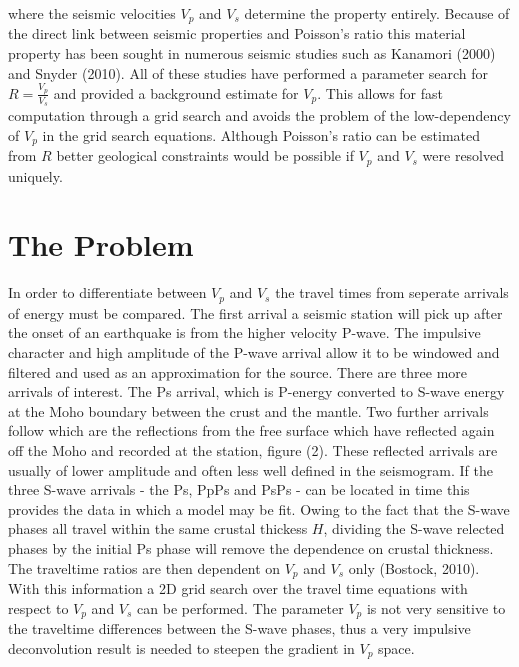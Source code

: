 \documentclass[jgrga]{agutex}
\begin{document}
\begin{article}
where the seismic velocities $V_p$ and $V_s$ determine the property entirely. Because of the direct link between seismic properties and Poisson's ratio this material property has been sought in numerous seismic studies such as Kanamori (2000) and Snyder (2010). All of these studies have performed a parameter search for $R = \frac{V_p}{V_s}$ and provided a background estimate for $V_p$. This allows for fast computation through a grid search and avoids the problem of the low-dependency of $V_p$ in the grid search equations. Although Poisson's ratio can be estimated from $R$ better geological constraints would be possible if $V_p$ and $V_s$ were resolved uniquely. 

\section{The Problem}

In order to differentiate between $V_p$ and $V_s$ the travel times from seperate arrivals of energy must be compared. The first arrival a seismic station will pick up after the onset of an earthquake is from the higher velocity P-wave. The impulsive character and high amplitude of the P-wave arrival allow it to be windowed and filtered and used as an approximation for the source. There are three more arrivals of interest. The Ps arrival, which is P-energy converted to S-wave energy at the Moho boundary between the crust and the mantle. Two further arrivals follow which are the reflections from the free surface which have reflected again off the Moho and recorded at the station, figure (2). These reflected arrivals are usually of lower amplitude and often less well defined in the seismogram. If the three S-wave arrivals - the Ps, PpPs and PsPs - can be located in time this provides the data in which a model may be fit. Owing to the fact that the S-wave phases all travel within the same crustal thickess $H$, dividing the S-wave relected phases by the initial Ps phase will remove the dependence on crustal thickness. The traveltime ratios are then dependent on $V_p$ and $V_s$ only (Bostock, 2010). With this information a 2D grid search over the travel time equations with respect to $V_p$ and $V_s$ can be performed. The parameter $V_p$ is not very sensitive to the traveltime differences between the S-wave phases, thus a very impulsive deconvolution result is needed to steepen the gradient in $V_p$ space. 



\end{article}
\end{document}
